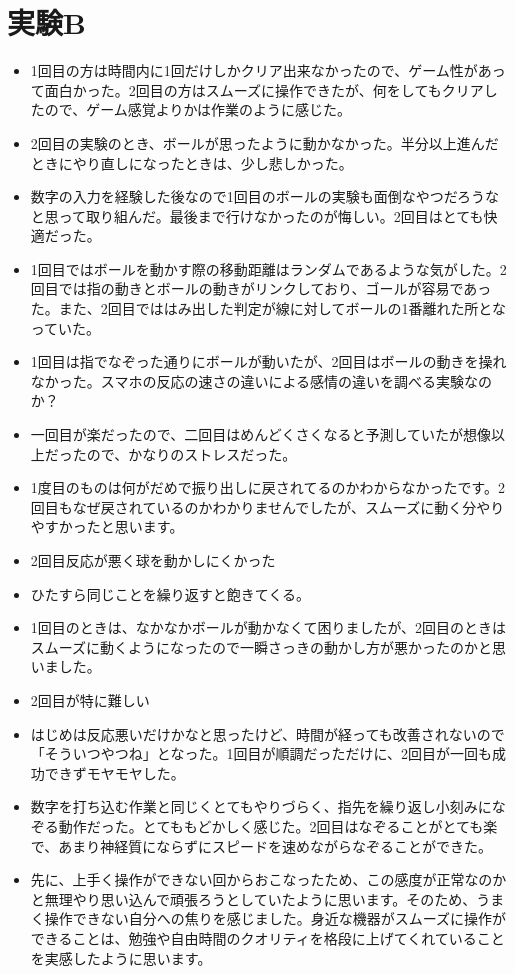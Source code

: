 \section{実験B}

\begin{itemize}
  \item 1回目の方は時間内に1回だけしかクリア出来なかったので、ゲーム性があって面白かった。2回目の方はスムーズに操作できたが、何をしてもクリアしたので、ゲーム感覚よりかは作業のように感じた。
  \item 2回目の実験のとき、ボールが思ったように動かなかった。半分以上進んだときにやり直しになったときは、少し悲しかった。
  \item 数字の入力を経験した後なので1回目のボールの実験も面倒なやつだろうなと思って取り組んだ。最後まで行けなかったのが悔しい。2回目はとても快適だった。
  \item 1回目ではボールを動かす際の移動距離はランダムであるような気がした。2回目では指の動きとボールの動きがリンクしており、ゴールが容易であった。また、2回目でははみ出した判定が線に対してボールの1番離れた所となっていた。
  \item 1回目は指でなぞった通りにボールが動いたが、2回目はボールの動きを操れなかった。スマホの反応の速さの違いによる感情の違いを調べる実験なのか？
  \item 一回目が楽だったので、二回目はめんどくさくなると予測していたが想像以上だったので、かなりのストレスだった。
  \item 1度目のものは何がだめで振り出しに戻されてるのかわからなかったです。2回目もなぜ戻されているのかわかりませんでしたが、スムーズに動く分やりやすかったと思います。
  \item 2回目反応が悪く球を動かしにくかった
  \item ひたすら同じことを繰り返すと飽きてくる。
  \item 1回目のときは、なかなかボールが動かなくて困りましたが、2回目のときはスムーズに動くようになったので一瞬さっきの動かし方が悪かったのかと思いました。
  \item 2回目が特に難しい
  \item はじめは反応悪いだけかなと思ったけど、時間が経っても改善されないので「そういつやつね」となった。1回目が順調だっただけに、2回目が一回も成功できずモヤモヤした。
  \item 数字を打ち込む作業と同じくとてもやりづらく、指先を繰り返し小刻みになぞる動作だった。とてももどかしく感じた。2回目はなぞることがとても楽で、あまり神経質にならずにスピードを速めながらなぞることができた。
  \item 先に、上手く操作ができない回からおこなったため、この感度が正常なのかと無理やり思い込んで頑張ろうとしていたように思います。そのため、うまく操作できない自分への焦りを感じました。身近な機器がスムーズに操作ができることは、勉強や自由時間のクオリティを格段に上げてくれていることを実感したように思います。

\end{itemize}
